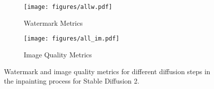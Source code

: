 \begin{figure*}[ht]
\vskip 0.2in
\begin{center}
\begin{subfigure}[t]{0.45\textwidth}
    \centerline{\texttt{[image: figures/allw.pdf]}}
    \caption{Watermark Metrics}
    \label{fig:eval_steps_w}
\end{subfigure}
\hfill
\begin{subfigure}[t]{0.45\textwidth}
    \centerline{\texttt{[image: figures/all\_im.pdf]}}
    \caption{Image Quality Metrics}
    \label{fig:eval_steps_im}
\end{subfigure}
\caption{Watermark and image quality metrics for different diffusion steps in the inpainting process for Stable Diffusion 2. }
\label{fig:eval_steps}
\end{center}
\vskip -0.2in
\end{figure*}